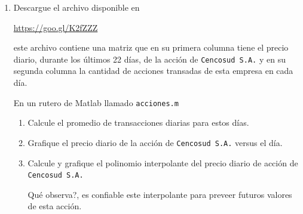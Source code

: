 \documentclass[letter,11pt]{article}
\newcommand{\matlab}{{\sc Matlab} }
\begin{document}
\begin{enumerate}
\textbf{Desarrollo:} Pueden venir anexas dos funciones que implementen los m\'etodos de bisecci\'on y/o de Newton--Raphson, similares a
\begin{lstlisting}
function xr=bisec(f,xa,xb,tol)                                    
while abs(xa-xb)>=tol           	%
    xr=(xa+xb)/2;                   %
    if f(xa)*f(xr)<0                %
        xb=xr;                      %
    else
        xa=xr;                      %
    end
end
\end{lstlisting}

\begin{lstlisting}
function x1=newtonR(f,df,x0,tol)
x1=x0+tol;
while abs(x0-x1)>=tol                          %
  x1=x0-f(x0)/df(x0);                          %
  x0=x1;
end
\end{lstlisting}

El programa \texttt{polinomio.m} debe tener instrucciones similares a
\begin{lstlisting}
clear all; close all; clc;
f=@(x) 1/8*(23*x.^5-70*x.^3+15*x);
df=@(x) 1/8*(23*5*x.^4-70*3*x.^2+15);
x=-1:0.01:1;
plot(x,f(x),'-k');
raicesN=[bisec(f,-0.9,-0.75,10^(-4)),bisec(f,-0.75,-0.25,10^(-4))]; 
	%Raices negativas
raicesP=[newtonR(f,df,0.5,10^(-6)),newtonR(f,df,0.75,10^(-6))]
	%Raices positivas

%%Grafica de las raices pedidas
hold on;
plot(raicesN,f(raicesN),'or',raicesP,f(raicesP),'ob')
\end{lstlisting}

\item Descargue el archivo disponible en
\begin{center}
\url{https://goo.gl/K2fZZZ}
\end{center}
este archivo contiene una matriz que en su primera columna tiene el precio diario, durante los \'ultimos 22 d\'ias, de la acci\'on de \texttt{Cencosud S.A.} y en su segunda columna la cantidad de acciones transadas de esta empresa en cada d\'ia.

En un rutero de \matlab llamado \texttt{acciones.m}
\begin{enumerate}
\item Calcule el promedio de transacciones diarias para estos d\'ias.
\item Grafique el precio diario de la acci\'on de \texttt{Cencosud S.A.} versus el d\'ia.
\item Calcule y grafique el polinomio interpolante del precio diario de acci\'on de \texttt{Cencosud S.A.}

\textquestiondown Qu\'e observa?, es confiable este interpolante para preveer futuros valores de esta acci\'on.


\end{enumerate}
\end{enumerate}
\end{document}
